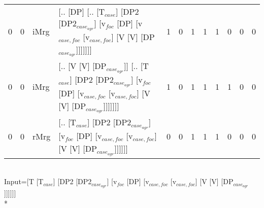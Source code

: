 \begin{tabularx}{\linewidth}{rrlXrrrrrrrr}
   0 &   0 & iMrg & [.. [DP] [.. [T$_{case}$] [DP2 [DP2$_{case_{agr}}$] [v$_{foc}$ [DP] [v$_{case,foc}$ [v$_{case,foc}$] [V [V] [DP$_{case_{agr}}$]]]]]]]                                                                              &            1 &              0 &             1 &             1 &             1 &                  0 &            0 &              0 \\
   0 &   0 & iMrg & [.. [V [V] [DP$_{case_{agr}}$]] [.. [T$_{case}$] [DP2 [DP2$_{case_{agr}}$] [v$_{foc}$ [DP] [v$_{case,foc}$ [v$_{case,foc}$] [V [V] [DP$_{case_{agr}}$]]]]]]]                                                             &            1 &              0 &             1 &             1 &             1 &                  1 &            0 &              0 \\
   0 &   0 & rMrg & [.. [T$_{case}$] [DP2 [DP2$_{case_{agr}}$] [v$_{foc}$ [DP] [v$_{case,foc}$ [v$_{case,foc}$] [V [V] [DP$_{case_{agr}}$]]]]]]                                                                                        &            0 &              0 &             1 &             1 &             1 &                  0 &            0 &              0 \\
\hline
\end{tabularx}\endgroup\\
\begingroup\scriptsize Input=[T [T$_{case}$] [DP2 [DP2$_{case_{agr}}$] [v$_{foc}$ [DP] [v$_{case,foc}$ [v$_{case,foc}$] [V [V] [DP$_{case_{agr}}$]]]]]]\\*
